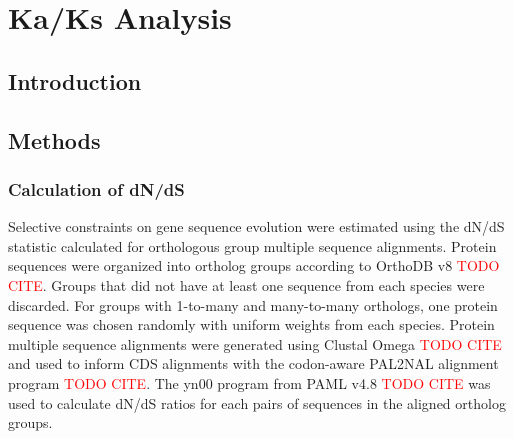 \section{Ka/Ks Analysis}

\subsection{Introduction}

\subsection{Methods}

\subsubsection{Calculation of dN/dS}

Selective constraints on gene sequence evolution were estimated using the dN/dS statistic calculated for orthologous group multiple sequence alignments. 
Protein sequences were organized into ortholog groups according to OrthoDB v8 \textcolor{red}{TODO CITE}. Groups that did not have at least one sequence from each species were discarded.  For groups with 1-to-many and many-to-many orthologs, one protein sequence was chosen randomly with uniform weights from each species. Protein multiple sequence alignments were generated using Clustal Omega \textcolor{red}{TODO CITE} and used to inform CDS alignments with the codon-aware PAL2NAL alignment program \textcolor{red}{TODO CITE}.  The yn00 program from PAML v4.8 \textcolor{red}{TODO CITE} was used to calculate dN/dS ratios for each pairs of sequences in the aligned ortholog groups. 


